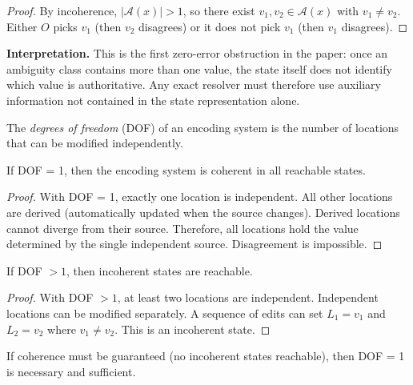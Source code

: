 \begin{proof}
By incoherence, $|\mathcal A(x)|>1$, so there exist $v_1,v_2\in\mathcal A(x)$ with $v_1\neq v_2$. Either $O$ picks $v_1$ (then $v_2$ disagrees) or it does not pick $v_1$ (then $v_1$ disagrees).
\end{proof}

\textbf{Interpretation.} This is the first zero-error obstruction in the paper: once an ambiguity class contains more than one value, the state itself does not identify which value is authoritative. Any exact resolver must therefore use auxiliary information not contained in the state representation alone.

\begin{definition}\label{def:dof-epistemic}
The \emph{degrees of freedom} (DOF) of an encoding system is the number of locations that can be modified independently.
\end{definition}

\begin{theorem}[DOF = 1 Guarantees Coherence]\label{thm:dof-one-coherence}
If DOF = 1, then the encoding system is coherent in all reachable states.
\end{theorem}

\begin{proof}
With DOF = 1, exactly one location is independent. All other locations are derived (automatically updated when the source changes). Derived locations cannot diverge from their source. Therefore, all locations hold the value determined by the single independent source. Disagreement is impossible.
\end{proof}

\begin{theorem}\label{thm:dof-gt-one-incoherence}
If DOF $> 1$, then incoherent states are reachable.
\end{theorem}

\begin{proof}
With DOF $> 1$, at least two locations are independent. Independent locations can be modified separately. A sequence of edits can set $L_1 = v_1$ and $L_2 = v_2$ where $v_1 \neq v_2$. This is an incoherent state.
\end{proof}

\begin{corollary}[Coherence Forces DOF = 1]\label{cor:coherence-forces-ssot}
If coherence must be guaranteed (no incoherent states reachable), then DOF = 1 is necessary and sufficient.
\end{corollary}

